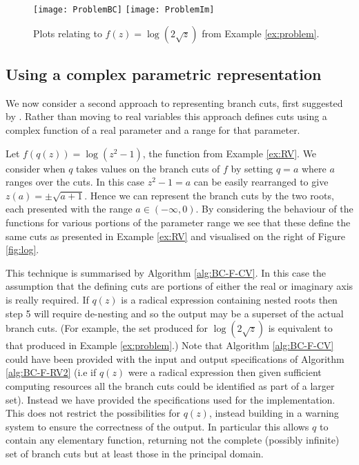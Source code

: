 \documentclass{llncs}
\begin{document}
\begin{figure}[ht] 
\begin{center}
\texttt{[image: ProblemBC]}
\hspace*{0.3cm}
\texttt{[image: ProblemIm]}
\end{center}
\caption{Plots relating to $f(z)=\log(2\sqrt{z})$ from Example \ref{ex:problem}.} 
\label{fig:problem}
\end{figure}

\subsection{Using a complex parametric representation}

We now consider a second approach to representing branch cuts, first suggested by \cite{DF94}.  Rather than moving to real variables this approach defines cuts using a complex function of a real parameter and a range for that parameter.

\begin{example}
\label{ex:CV}
Let $f(q(z)) = \log(z^2-1)$, the function from Example \ref{ex:RV}.   We consider when $q$ takes values on the branch cuts of $f$ by setting $q=a$ where $a$ ranges over the cuts.  In this case $z^2-1=a$ can be easily rearranged to give $z(a)=\pm \sqrt{a+1}$.  Hence we can represent the branch cuts by the two roots, each presented with the range $a \in (-\infty, 0)$.  By considering the behaviour of the functions for various portions of the parameter range we see that these define the same cuts as presented in Example \ref{ex:RV} and visualised on the right of Figure \ref{fig:log}.
\end{example}

This technique is summarised by Algorithm \ref{alg:BC-F-CV}.  In this case the 
assumption that the defining cuts are portions of either the real or imaginary axis is really required.   If $q(z)$ is a radical expression containing nested roots then step 5 will require de-nesting and so the output may be a superset of the actual branch cuts.  (For example, the set produced for $\log(2\sqrt{z})$ is equivalent to that produced in Example \ref{ex:problem}.)  Note that Algorithm \ref{alg:BC-F-CV} could have been provided with the input and output specifications of Algorithm \ref{alg:BC-F-RV2} (i.e if $q(z)$ were a radical expression then given sufficient computing resources all the branch cuts could be identified as part of a larger set).  Instead we have provided the specifications used for the implementation.  This does not restrict the possibilities for $q(z)$, instead building in a warning system to ensure the correctness of the output.  In particular this allows $q$ to contain any elementary function, returning not the complete (possibly infinite) set of branch cuts but at least those in the principal domain.
\end{document}
